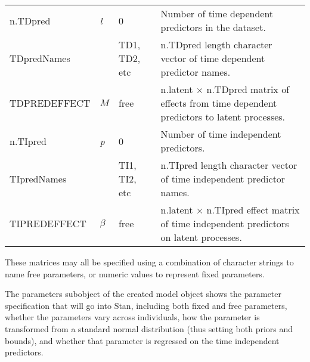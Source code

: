 \documentclass[nojss]{jss}\usepackage[]{graphicx}\usepackage[]{color}
\begin{document}
\begin{table}
\begin{tabular}{l|l|l p{8cm} }
 n.TDpred & \textit{l} & 0 & Number of time dependent predictors in the dataset.\\
 TDpredNames & & TD1, TD2, etc & n.TDpred length character vector of time dependent predictor names.\\
 TDPREDEFFECT & $M$ & free & n.latent $\times$ n.TDpred matrix of effects from time dependent predictors to latent processes.\\
 n.TIpred & \textit{p} & 0 & Number of time independent predictors.\\
 TIpredNames & & TI1, TI2, etc & n.TIpred length character vector of time independent predictor names.\\
 TIPREDEFFECT & $\beta$ & free & n.latent $\times$ n.TIpred effect matrix of time independent predictors on latent processes.\\
\end{tabular}
\end{table}

These matrices may all be specified using a combination of character strings to name free parameters, or numeric values to represent fixed parameters. 

The parameters subobject of the created model object shows the parameter specification that will go into Stan, including both fixed and free parameters, whether the parameters vary across individuals, how the parameter is transformed from a standard normal distribution (thus setting both priors and bounds), and whether that parameter is regressed on the time independent predictors.
\end{document}
